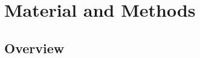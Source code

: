 \documentclass[
  12pt,
]{article}
\providecommand{\DIFaddbegin}{} %
\providecommand{\DIFaddend}{} %
\providecommand{\DIFdelbegin}{} %
\providecommand{\DIFdelend}{} %
\newcommand{\DIFscaledelfig}{0.5}
\newlength{\DIFdelgraphicswidth} %
\newlength{\DIFdelgraphicsheight} %
\newcommand{\DIFaddincludegraphics}[2][]{{\color{blue}\fbox{\DIFOincludegraphics[#1]{#2}}}} %
\newcommand{\DIFdelincludegraphics}[2][]{%
\sbox{\DIFdelgraphicsbox}{\DIFOincludegraphics[#1]{#2}}%
\settoboxwidth{\DIFdelgraphicswidth}{\DIFdelgraphicsbox} %
\settoboxtotalheight{\DIFdelgraphicsheight}{\DIFdelgraphicsbox} %
\scalebox{\DIFscaledelfig}{%
\parbox[b]{\DIFdelgraphicswidth}{\usebox{\DIFdelgraphicsbox}\\[-\baselineskip] \rule{\DIFdelgraphicswidth}{0em}}\llap{\resizebox{\DIFdelgraphicswidth}{\DIFdelgraphicsheight}{%
\setlength{\unitlength}{\DIFdelgraphicswidth}%
\begin{picture}(1,1)%
\thicklines\linethickness{2pt} %
{\color[rgb]{1,0,0}\put(0,0){\framebox(1,1){}}}%
{\color[rgb]{1,0,0}\put(0,0){\line( 1,1){1}}}%
{\color[rgb]{1,0,0}\put(0,1){\line(1,-1){1}}}%
\end{picture}%
}\hspace*{3pt}}} %
} %
\DeclareRobustCommand{\DIFaddbegin}{\DIFOaddbegin \let\includegraphics\DIFaddincludegraphics} %
\DeclareRobustCommand{\DIFaddend}{\DIFOaddend \let\includegraphics\DIFOincludegraphics} %
\DeclareRobustCommand{\DIFdelbegin}{\DIFOdelbegin \let\includegraphics\DIFdelincludegraphics} %
\DeclareRobustCommand{\DIFdelend}{\DIFOaddend \let\includegraphics\DIFOincludegraphics} %
\begin{document}
\hypertarget{material-and-methods}{%
\section{Material and Methods}\label{material-and-methods}}

\DIFdelbegin %
\DIFdelend \DIFaddbegin \hypertarget{overview}{%
\subsection{Overview}\label{overview}}
\DIFaddend 
\end{document}
